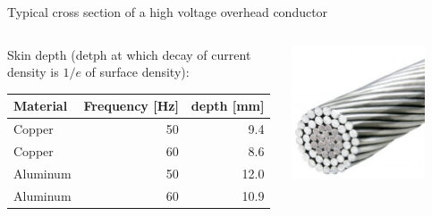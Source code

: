 \begin{frame}{Typical cross section of a high voltage overhead conductor}
    
\begin{columns}

    \begin{column}{0.56\textwidth}
        Skin depth (detph at which decay of current density is $1/e$ of surface density):\\[\baselineskip]
        \begin{tabular}{l r r}
        Material & Frequency [Hz] & depth [mm]\\
        \hline
        Copper & 50 & 9.4 \\
        Copper & 60 & 8.6 \\
        Aluminum & 50 & 12.0 \\
        Aluminum & 60 & 10.9\\
    \end{tabular}
    \end{column}
    \begin{column}{0.4\textwidth}
        \centering
        \includegraphics[width=0.8\textwidth]{images/conductor-300x300.jpg}
    \end{column}
    
\end{columns}




\end{frame}

